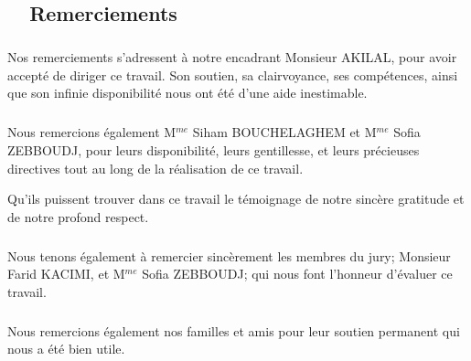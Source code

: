 \begin{titlepage}
\newpage
\pagestyle{fancy}      
\lhead{}  
\chead{}     
\rhead{}     
    
\renewcommand{\headrulewidth}{0.5pt}

\chapter*{\hrulefill ~~\textbf{Remerciements}~ \hrulefill}
\paragraph{}
\paragraph{}
\large

Nos remerciements s'adressent à notre encadrant Monsieur AKILAL, pour avoir
accepté de diriger ce travail. Son soutien, sa clairvoyance, ses compétences, 
ainsi que son infinie disponibilité nous ont été d'une aide inestimable.

\paragraph{}

Nous remercions également M$^{me}$ Siham BOUCHELAGHEM et M$^{me}$ Sofia
ZEBBOUDJ, pour leurs disponibilité, leurs gentillesse, et leurs précieuses
directives tout au long de la réalisation de ce travail.

Qu'ils puissent trouver dans ce travail le témoignage de notre sincère gratitude
et de notre profond respect.

\paragraph{}

Nous tenons également à remercier sincèrement les membres du jury; Monsieur Farid
KACIMI, et M$^{me}$ Sofia ZEBBOUDJ; qui nous font l’honneur d'évaluer ce travail.

\paragraph{}

Nous remercions également nos familles et amis pour leur soutien permanent qui
nous a été bien utile.

\paragraph{}


\end{titlepage}
